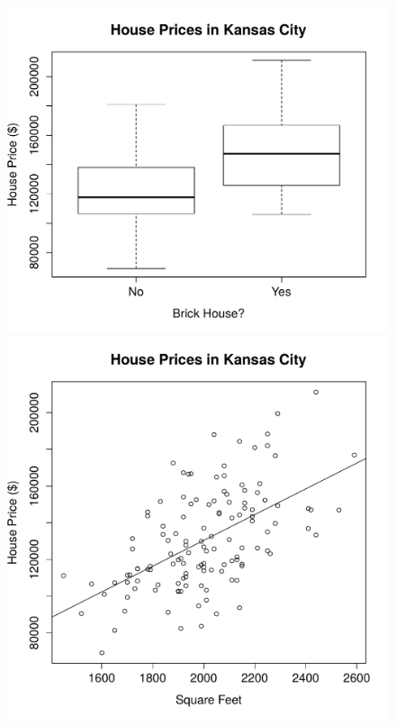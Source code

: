 \documentclass[addpoints,12pt]{exam}
\begin{document}
\begin{questions}
\newpage
\begin{figure}[h]
  \centering
  \includegraphics[scale=0.65]{finalDec2015_boxplot}\\
  \vspace{1em}
  \includegraphics[scale=0.65]{finalDec2015_plot}
\end{figure}

\end{questions}
\end{document}
